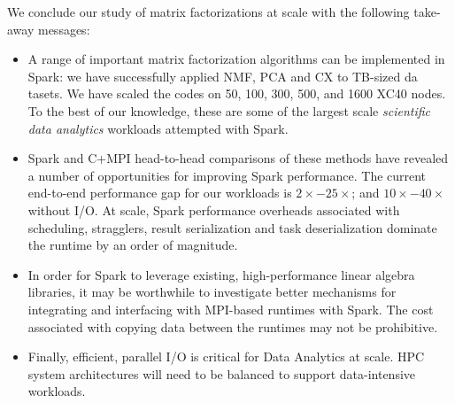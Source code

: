 We conclude our study of matrix factorizations at scale with the following take-away messages: 
\begin{itemize}
  \item{A range of important matrix factorization algorithms can be implemented in Spark: we have successfully applied NMF, PCA and CX to TB-sized da tasets. We have scaled the codes on 50, 100, 300, 500, and 1600 XC40 nodes. To the best of our knowledge, these are some of the largest scale \emph{scientific data analytics} workloads attempted with Spark.}
\item{Spark and C+MPI head-to-head comparisons of these methods have revealed a number of opportunities for improving Spark performance. The current end-to-end performance gap for our workloads is $2\times - 25\times$; and $10\times - 40\times$ without I/O. At scale, Spark performance overheads associated with scheduling, stragglers, result serialization and task deserialization dominate the runtime by an order of magnitude.}
\item{{In order for Spark to leverage existing, high-performance linear algebra libraries, it may be worthwhile to investigate better mechanisms for integrating and interfacing with MPI-based runtimes with Spark. The cost associated with copying data between the runtimes may not be prohibitive.}}
\item{Finally, efficient, parallel I/O is critical for Data Analytics at scale. HPC system architectures will need to be balanced to support data-intensive workloads.}
\end{itemize}
